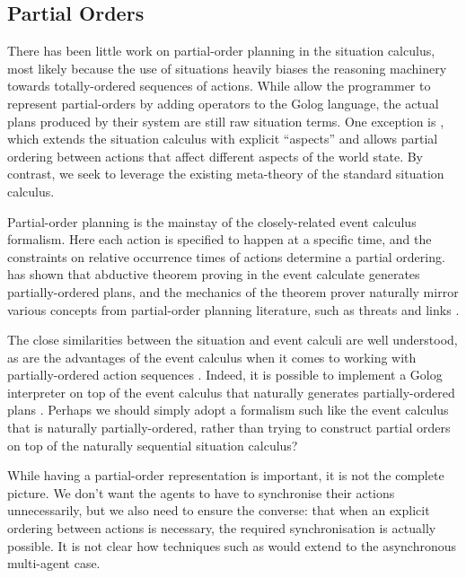 \subsection{Partial Orders}

There has been little work on partial-order planning in the situation
calculus, most likely because the use of situations heavily biases
the reasoning machinery towards totally-ordered sequences of actions.
While \citet{son00htn_golog} allow the programmer to represent partial-orders
by adding operators to the Golog language, the actual plans produced
by their system are still raw situation terms. One exception is \citep{plaisted97sc_aspect},
which extends the situation calculus with explicit {}``aspects''
and allows partial ordering between actions that affect different
aspects of the world state. By contrast, we seek to leverage the existing
meta-theory of the standard situation calculus.

Partial-order planning is the mainstay of the closely-related event
calculus formalism. Here each action is specified to happen at a specific
time, and the constraints on relative occurrence times of actions
determine a partial ordering. \citet{Shanahan97ec_planning} has shown
that abductive theorem proving in the event calculate generates partially-ordered
plans, and the mechanics of the theorem prover naturally mirror various
concepts from partial-order planning literature, such as threats and
links \citep{peot92conditional_nonlinear}.

The close similarities between the situation and event calculi are
well understood, as are the advantages of the event calculus when
it comes to working with partially-ordered action sequences \citep{belleghem97sitcalc_evtcalc}.
Indeed, it is possible to implement a Golog interpreter on top of
the event calculus that naturally generates partially-ordered plans
\citep{pereira04ec_golog}. Perhaps we should simply adopt a formalism
such like the event calculus that is naturally partially-ordered,
rather than trying to construct partial orders on top of the naturally
sequential situation calculus?

While having a partial-order representation is important, it is not
the complete picture. We don't want the agents to have to synchronise
their actions unnecessarily, but we also need to ensure the converse:
that when an explicit ordering between actions is necessary, the required
synchronisation is actually possible. It is not clear how techniques
such as \citep{pereira04ec_golog} would extend to the asynchronous
multi-agent case.

